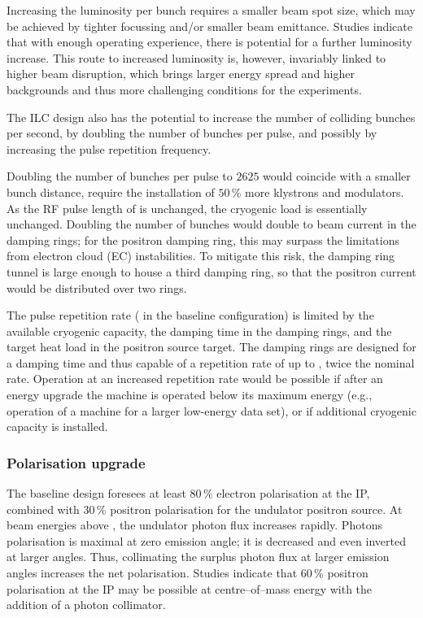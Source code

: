 Increasing the luminosity per bunch requires a smaller beam spot size, which may be achieved by tighter focussing and/or smaller beam emittance.
Studies indicate that with enough operating experience, there is potential for a further luminosity increase. 
This route to increased luminosity is, however, invariably linked to higher beam disruption, which brings larger energy spread and higher backgrounds and thus more challenging conditions for the experiments.

The ILC design also has the potential to increase the number of colliding bunches per second, by doubling the number of bunches per pulse, and possibly by increasing the pulse repetition frequency.

Doubling the number of bunches per pulse to $2625$ would coincide with a smaller bunch distance, require the installation of $50\,\%$ more klystrons and modulators. 
As the RF pulse length of  is unchanged, the cryogenic load is essentially unchanged.
Doubling the number of bunches would double to beam current in the damping rings;
for the positron damping ring, this may surpass the limitations from electron cloud (EC) instabilities. 
To mitigate this risk, the damping ring tunnel is large enough to house a third damping ring, so that the positron current would be distributed over two rings.

The pulse repetition rate ( in the baseline configuration) is limited by the available cryogenic capacity, the damping time in the damping rings, and the target heat load in the positron source target.
The damping rings are designed for a  damping time and thus capable of a repetition rate of up to , twice the nominal rate.
Operation at an increased repetition rate would be possible if after an energy upgrade the machine is operated below its maximum energy (e.g.,  operation of a  machine for a larger low-energy data set), or if additional cryogenic capacity is installed.

\subsubsection{Polarisation upgrade}
\label{subsubsec:upg-optP}

The baseline design foresees at least $80\,\%$ electron polarisation at the IP, combined with $30\,\%$ positron polarisation for the undulator positron source.
At beam energies above , the undulator photon flux increases rapidly. 
Photons polarisation is maximal at zero emission angle; it is decreased and even inverted at larger angles.
Thus, collimating the surplus photon flux at larger emission angles increases the net polarisation. 
Studies indicate that $60\,\%$ positron polarisation at the IP may be possible at  centre--of--mass energy with the addition of a photon collimator.
 


